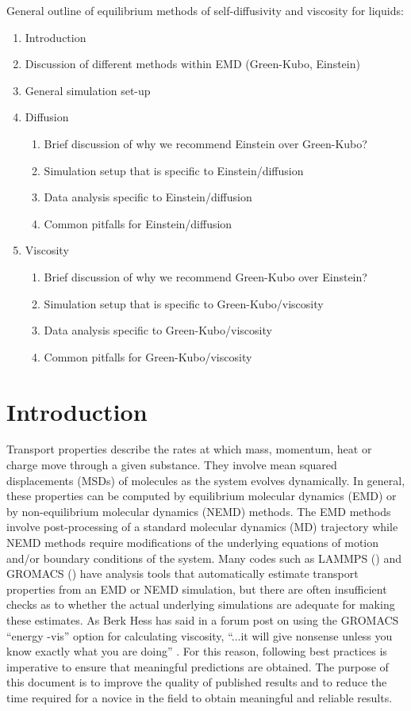 \documentclass[9pt]{livecoms}
\begin{document}
General outline of equilibrium methods of self-diffusivity and viscosity for liquids:
\begin{enumerate}
	\item Introduction
	\item Discussion of different methods within EMD (Green-Kubo, Einstein)
	\item General simulation set-up
	\item Diffusion
	\begin{enumerate}
		\item Brief discussion of why we recommend Einstein over Green-Kubo?
		\item Simulation setup that is specific to Einstein/diffusion
		\item Data analysis specific to Einstein/diffusion
		\item Common pitfalls for Einstein/diffusion
	\end{enumerate}
	\item Viscosity
	\begin{enumerate}
		\item Brief discussion of why we recommend Green-Kubo over Einstein?
		\item Simulation setup that is specific to Green-Kubo/viscosity
		\item Data analysis specific to Green-Kubo/viscosity
		\item Common pitfalls for Green-Kubo/viscosity
	\end{enumerate}
\end{enumerate}


\section{Introduction}

Transport properties describe the rates at which mass, momentum, heat or charge move through a given substance. They involve mean squared displacements (MSDs) of molecules as the system evolves dynamically. In general, these properties can be computed by equilibrium molecular dynamics (EMD) or by non-equilibrium molecular dynamics (NEMD) methods. The EMD methods involve post-processing of a standard molecular dynamics (MD) trajectory while NEMD methods require modifications of the underlying equations of motion and/or boundary conditions of the system. Many codes such as LAMMPS (\cite{LAMMPS}) and GROMACS (\cite{GROMACS}) have analysis tools that automatically estimate transport properties from an EMD or NEMD simulation, but there are often insufficient checks as to whether the actual underlying simulations are adequate for making these estimates. As Berk Hess has said in a forum post on using the GROMACS ``energy -vis'' option for calculating viscosity, ``...it will give nonsense unless you know exactly what you are doing'' \cite{HessForum}. For this reason, following best practices is imperative to ensure that meaningful predictions are obtained. The purpose of this document is to improve the quality of published results and to reduce the time required for a novice in the field to obtain meaningful and reliable results.
\end{document}
